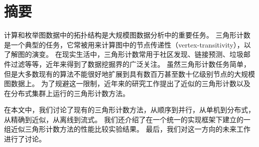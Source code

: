 \documentclass[twoside]{Style/ucasthesis}%
\begin{document}
\frontmatter%
\maketitle

\intobmk\chapter*{摘\quad 要}%
\setcounter{page}{1}%

计算和枚举图数据中的拓扑结构是大规模图数据分析中的重要任务。
三角形计数是一个典型的任务，它常被用来计算图中的节点传递性（vertex-transitivity），以了解图的演变。
在现实生活中，三角形计数常用于社区发现、链接预测、垃圾邮件过滤等等，近年来得到了数据挖掘界的广泛关注。
虽然三角形计数任务简单，但是大多数现有的算法不能很好地扩展到具有数百万甚至数十亿级别节点的大规模图数据上。
为了规避这一限制，近年来的研究工作提出了近似的三角形计数以及在分布式集群上运行的三角形计数方法。

在本文中，我们讨论了现有的三角形计数方法，从顺序到并行，从单机到分布式，从精确到近似，从离线到流式。
我们还介绍了在一个统一的实现框架下建立的一组近似三角形计数方法的性能比较实验结果。
最后，我们对这一方向的未来工作进行了讨论。

{%
\linespread{1.2}%
\intobmk*{\cleardoublepage}{\contentsname}%
\tableofcontents%
}
\mainmatter%
\cleardoublepage%
\backmatter%
\intotoc*{\cleardoublepage}{\bibname}%
\end{document}
